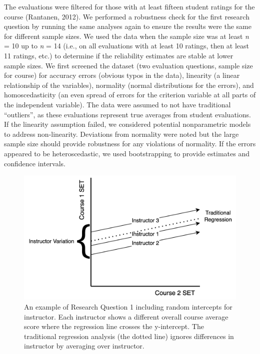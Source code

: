 \documentclass[
  man]{apa7}
\begin{document}
The evaluations were filtered for those with at least fifteen student
ratings for the course (Rantanen, 2012). We performed a robustness check
for the first research question by running the same analyses again to
ensure the results were the same for different sample sizes. We used the
data when the sample size was at least \emph{n} = 10 up to \emph{n} = 14 (i.e., on
all evaluations with at least 10 ratings, then at least 11 ratings,
etc.) to determine if the reliability estimates are stable at lower
sample sizes. We first screened the dataset (two evaluation questions,
sample size for course) for accuracy errors (obvious typos in the data),
linearity (a linear relationship of the variables), normality (normal
distributions for the errors), and homoscedasticity (an even spread of
errors for the criterion variable at all parts of the independent
variable). The data were assumed to not have traditional ``outliers'', as
these evaluations represent true averages from student evaluations. If
the linearity assumption failed, we considered potential nonparametric
models to address non-linearity. Deviations from normality were noted
but the large sample size should provide robustness for any violations
of normality. If the errors appeared to be heteroscedastic, we used
bootstrapping to provide estimates and confidence intervals.

\begin{figure}
\includegraphics[width=4.67in]{includes/random_intercept} \caption{An example of Research Question 1 including random intercepts for instructor. Each instructor shows a different overall course average score where the regression line crosses the y-intercept. The traditional regression analysis (the dotted line) ignores differences in instructor by averaging over instructor.}\label{fig:figure-random-explain}
\end{figure}
\end{document}
